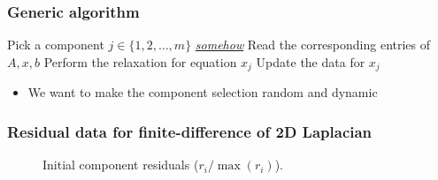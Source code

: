 \documentclass{beamer}
\begin{document}
\begin{frame}
	\frametitle{Generic algorithm}
	\begin{algorithm}[H]
		\DontPrintSemicolon
		 {
			 {
				Pick a component $j \in \{1, 2, \ldots, m\}$ {\em{\underline{somehow}}} \; 
				Read the corresponding entries of $A, x, b$ \;
				Perform the relaxation for equation $x_j$ \;
				Update the data for $x_j$ \;
			}
		}
	\end{algorithm}
	\begin{itemize}
	    \item We want to make the component selection random and dynamic
	\end{itemize}
\end{frame}


\begin{frame}
	\frametitle{Residual data for finite-difference of 2D Laplacian}
	\begin{figure}[H]
		\centering
		\caption{Initial component residuals ($r_i / \max (r_i)$).}
		\label{fig:initial-residuals-laplacian}
	\end{figure}
\end{frame}
\end{document}
